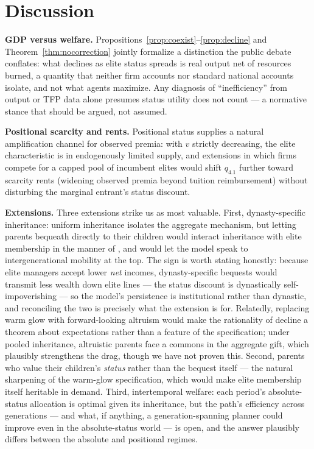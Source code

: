 \documentclass[12pt,letterpaper]{article}
\theoremstyle{definition}
\begin{document}
\section{Discussion}\label{sec:discussion}

\textbf{GDP versus welfare.}
Propositions~\ref{prop:coexist}--\ref{prop:decline} and Theorem~\ref{thm:nocorrection} jointly formalize a distinction the public debate conflates: what declines as elite status spreads is real output net of resources burned, a quantity that neither firm accounts nor standard national accounts isolate, and not what agents maximize.
Any diagnosis of ``inefficiency'' from output or TFP data alone presumes status utility does not count --- a normative stance that should be argued, not assumed.

\textbf{Positional scarcity and rents.}
Positional status supplies a natural amplification channel for observed premia: with $v$ strictly decreasing, the elite characteristic is in endogenously limited supply, and extensions in which firms compete for a capped pool of incumbent elites would shift $q_{4.1}$ further toward scarcity rents (widening observed premia beyond tuition reimbursement) without disturbing the marginal entrant's status discount.

\textbf{Extensions.}
Three extensions strike us as most valuable.
First, dynasty-specific inheritance: uniform inheritance isolates the aggregate mechanism, but letting parents bequeath directly to their children would interact inheritance with elite membership in the manner of \citet{galorzeira1993}, and would let the model speak to intergenerational mobility at the top.
The sign is worth stating honestly: because elite managers accept lower \emph{net} incomes, dynasty-specific bequests would transmit less wealth down elite lines --- the status discount is dynastically self-impoverishing --- so the model's persistence is institutional rather than dynastic, and reconciling the two is precisely what the extension is for.
Relatedly, replacing warm glow with forward-looking altruism would make the rationality of decline a theorem about expectations rather than a feature of the specification; under pooled inheritance, altruistic parents face a commons in the aggregate gift, which plausibly strengthens the drag, though we have not proven this.
Second, parents who value their children's \emph{status} rather than the bequest itself --- the natural sharpening of the warm-glow specification, which would make elite membership itself heritable in demand.
Third, intertemporal welfare: each period's absolute-status allocation is optimal given its inheritance, but the path's efficiency across generations --- and what, if anything, a generation-spanning planner could improve even in the absolute-status world --- is open, and the answer plausibly differs between the absolute and positional regimes.
\end{document}
